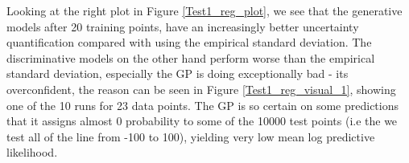 Looking at the right plot in Figure \ref{Test1_reg_plot}, we see that the generative models after 20
training points, have an increasingly better uncertainty quantification compared with using the empirical
standard deviation. %
The discriminative models on the other hand perform worse than the empirical standard deviation, 
especially the GP is doing exceptionally bad - its overconfident, the reason can be seen in Figure \ref{Test1_reg_visual_1},  
showing one of the 10 runs for 23 data points. The GP is so certain on some predictions that it assigns
almost 0 probability to some of the 10000 test points (i.e the we test all of the line from -100 to 100),
 yielding very low mean log predictive likelihood. 
